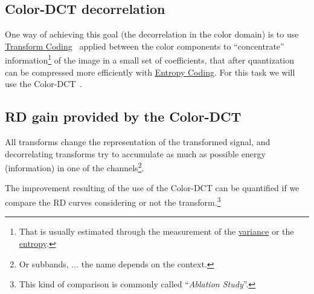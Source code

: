 \subsection{Color-DCT decorrelation}

One way of achieving this goal (the decorrelation in the color domain)
is to use
\href{https://vicente-gonzalez-ruiz.github.io/transform_coding/}{Transform
  Coding}~\cite{vruiz__transform_coding} applied between the color
components to ``concentrate'' information\footnote{That is usually
estimated through the measurement of the
\href{https://en.wikipedia.org/wiki/Variance}{variance} or the
\href{https://en.wikipedia.org/wiki/Entropy}{entropy}.} of the image
in a small set of coefficients, that after quantization can be
compressed more efficiently with
\href{https://en.wikipedia.org/wiki/Entropy_coding}{Entropy
  Coding}. For this task we will use the
Color-DCT~\cite{vruiz__color_DCT}.





\subsection{RD gain provided by the Color-DCT}

All transforms change the representation of the transformed signal,
and decorrelating transforms try to accumulate as much as possible
energy (information) in one of the channels\footnote{Or subbands,
... the name depends on the context.}.

The improvement resulting of the use of the Color-DCT can be
quantified if we compare the RD curves considering or not the
transform.\footnote{This kind of comparison is commonly called
``\emph{Ablation Study}''.}

